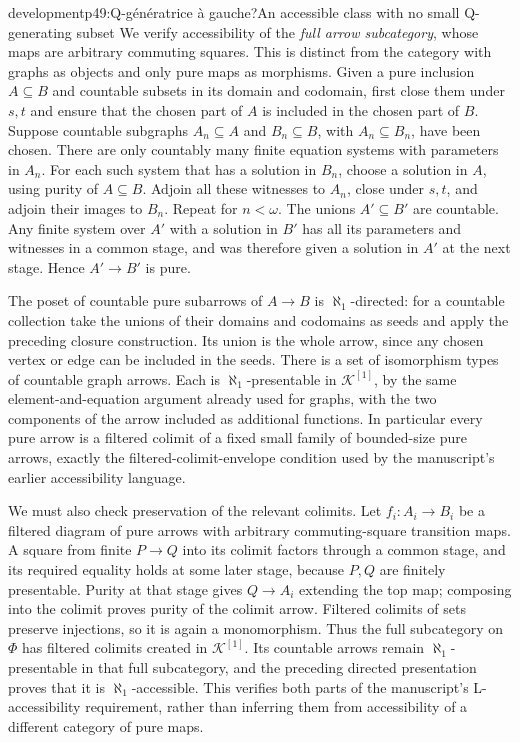 \begin{dcomment}{development}{p49:Q-génératrice à gauche?}{An accessible class with no small Q-generating subset}
We verify accessibility of the \emph{full arrow subcategory}, whose maps are arbitrary commuting squares. This is distinct from the category with graphs as objects and only pure maps as morphisms. Given a pure inclusion $A\subseteq B$ and countable subsets in its domain and codomain, first close them under $s,t$ and ensure that the chosen part of $A$ is included in the chosen part of $B$. Suppose countable subgraphs $A_n\subseteq A$ and $B_n\subseteq B$, with $A_n\subseteq B_n$, have been chosen. There are only countably many finite equation systems with parameters in $A_n$. For each such system that has a solution in $B_n$, choose a solution in $A$, using purity of $A\subseteq B$. Adjoin all these witnesses to $A_n$, close under $s,t$, and adjoin their images to $B_n$. Repeat for $n<\omega$. The unions $A'\subseteq B'$ are countable. Any finite system over $A'$ with a solution in $B'$ has all its parameters and witnesses in a common stage, and was therefore given a solution in $A'$ at the next stage. Hence $A'\to B'$ is pure.

The poset of countable pure subarrows of $A\to B$ is $\aleph_1$-directed: for a countable collection take the unions of their domains and codomains as seeds and apply the preceding closure construction. Its union is the whole arrow, since any chosen vertex or edge can be included in the seeds. There is a set of isomorphism types of countable graph arrows. Each is $\aleph_1$-presentable in $\mathcal K^{[1]}$, by the same element-and-equation argument already used for graphs, with the two components of the arrow included as additional functions. In particular every pure arrow is a filtered colimit of a fixed small family of bounded-size pure arrows, exactly the filtered-colimit-envelope condition used by the manuscript's earlier accessibility language.

We must also check preservation of the relevant colimits. Let $f_i:A_i\to B_i$ be a filtered diagram of pure arrows with arbitrary commuting-square transition maps. A square from finite $P\to Q$ into its colimit factors through a common stage, and its required equality holds at some later stage, because $P,Q$ are finitely presentable. Purity at that stage gives $Q\to A_i$ extending the top map; composing into the colimit proves purity of the colimit arrow. Filtered colimits of sets preserve injections, so it is again a monomorphism. Thus the full subcategory on $\Phi$ has filtered colimits created in $\mathcal K^{[1]}$. Its countable arrows remain $\aleph_1$-presentable in that full subcategory, and the preceding directed presentation proves that it is $\aleph_1$-accessible. This verifies both parts of the manuscript's L-accessibility requirement, rather than inferring them from accessibility of a different category of pure maps.


\end{dcomment}
